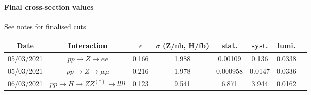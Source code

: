 \textbf{Final cross-section values}
\\\\
See notes for finalised cuts\\

\begin{tabular}{ | c | c | c | c | c | c | c | c |}
\hline		
Date & Interaction &  $\epsilon$ & $\sigma$ (Z/nb, H/fb) & stat. & syst. & lumi. \\
\hline
 05/03/2021&  $pp \rightarrow Z \rightarrow ee$& 0.166 & 1.988 & 0.00109 & 0.136 & 0.0338 \\
\hline
 05/03/2021&  $pp \rightarrow Z \rightarrow \mu\mu$&0.216 & 1.978 & 0.000958 &0.0147 & 0.0336 \\
\hline
 06/03/2021& $pp \rightarrow H \rightarrow ZZ^{(*)} \rightarrow llll$& 0.123 & 9.541 & 6.871  & 3.944 & 0.0162\\
\hline




\end{tabular}